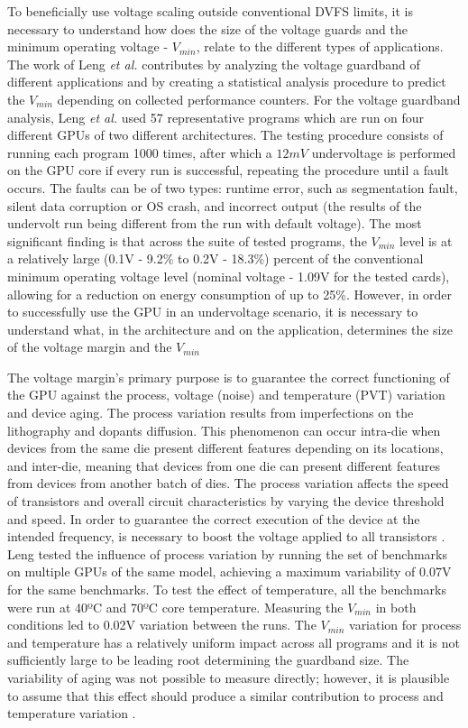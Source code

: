 To beneficially use voltage scaling outside conventional DVFS limits, it is necessary to understand how does the size of the voltage guards and the minimum operating voltage - $V_{min}$, relate to the different types of applications. The work of Leng \textit{et al.} \cite{leng_safe_2015} contributes by analyzing the voltage guardband of different applications and by creating a statistical analysis procedure to predict the $V_{min}$ depending on collected performance counters. For the voltage guardband analysis, Leng \textit{et al.} used 57 representative programs which are run on four different GPUs of two different architectures. The testing procedure consists of running each program 1000 times, after which a $12mV$ undervoltage is performed on the GPU core if every run is successful, repeating the procedure until a fault occurs. The faults can be of two types: runtime error, such as segmentation fault, silent data corruption or OS crash, and incorrect output (the results of the undervolt run being different from the run with default voltage).  The most significant finding is that across the suite of tested programs, the $V_{min}$ level is at a relatively large (0.1V - 9.2\% to 0.2V - 18.3\%) percent of the conventional minimum operating voltage level (nominal voltage - 1.09V for the tested cards), allowing for a reduction on energy consumption of up to 25\%. However, in order to successfully use the GPU in an undervoltage scenario, it is necessary to understand what, in the architecture and on the application, determines the size of the voltage margin and the $V_{min}$ 

The voltage margin's primary purpose is to guarantee the correct functioning of the GPU against the process, voltage (noise) and temperature (PVT) variation and device aging.
The process variation results from imperfections on the lithography and dopants diffusion. This phenomenon can occur intra-die when devices from the same die present different features depending on its locations, and inter-die, meaning that devices from one die can present different features from devices from another batch of dies. The process variation affects the speed of transistors and overall circuit characteristics by varying the device threshold and speed. In order to guarantee the correct execution of the device at the intended frequency, is necessary to boost the voltage applied to all transistors \cite{thomas_core_2016}.
Leng tested the influence of process variation by running the set of benchmarks on multiple GPUs of the same model, achieving a maximum variability of 0.07V for the same benchmarks. To test the effect of temperature, all the benchmarks were run at 40ºC and 70ºC core temperature. Measuring the $V_{min}$ in both conditions led to 0.02V variation between the runs. The  $V_{min}$ variation for process and temperature has a relatively uniform impact across all programs and it is not sufficiently large to be leading root determining the guardband size. The variability of aging was not possible to measure directly; however, it is plausible to assume that this effect should produce a similar contribution to process and temperature variation \cite{leng_safe_2015}.


